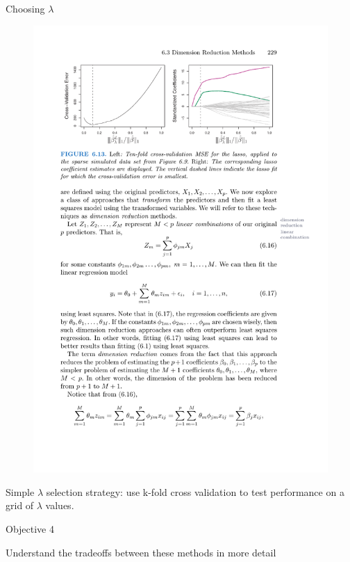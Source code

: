\documentclass[mathserif, aspectratio=169]{beamer}
\begin{document}
\begin{frame}{Choosing $\lambda$}
\begin{figure}
\includegraphics[scale=.85]{lasso-tenfold}
\end{figure}

\pause

Simple $\lambda$ selection strategy: use k-fold cross validation to test performance on a grid of $\lambda$ values. 


\end{frame}

\begin{frame}{Objective 4}

Understand the tradeoffs between these methods in more detail

\end{frame}
\end{document}
